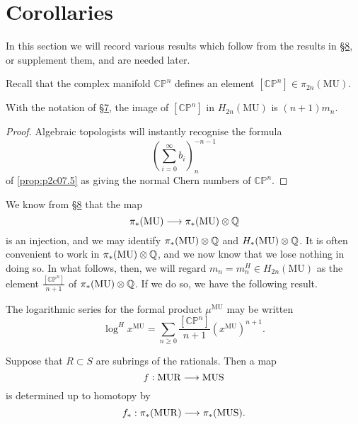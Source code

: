 \documentclass[../main]{subfiles}
\begin{document}
\label{sec:p2c9}
\chapter{Corollaries}
In this section we will record various results which follow from the results in \hyperref[sec:p2c8]{\S 8}, or supplement them, and are needed later.

Recall that the complex manifold $\mathbb {CP}^n$ defines an element $[\mathbb {CP}^n] \in \pi_{2n} (\mathrm {MU})$.

\begin{lemma}
\label{lem:p2c09.1}
With the notation of \hyperref[sec:p2c7]{\S 7}, the image of $[\mathbb {CP}^n]$ in $H_{2n}(\mathrm {MU})$ is $(n + 1)m_n$.
\end{lemma}

\begin{proof}
Algebraic topologists will instantly recognise the formula $$\left(\sum_{i = 0}^\infty b_i\right)_n^{-n - 1}$$ of \eqref{prop:p2c07.5} as giving the normal Chern numbers of $\mathbb {CP}^n$.
\end{proof}
We know from \hyperref[sec:p2c8]{\S 8} that the map $$\pi_\ast(\mathrm{MU}) \overset{}{\longrightarrow} \pi_\ast(\mathrm {MU}) \otimes \mathbb{Q}$$ is an injection, and we may identify $\pi_\ast(\mathrm{MU}) \otimes \mathbb{Q}$ and $H_\ast(\mathrm{MU}) \otimes \mathbb{Q}$. It is often convenient to work in $\pi_\ast(\mathrm{MU}) \otimes \mathbb{Q}$, and we now know that we lose nothing in doing so. In what follows, then, we will regard $m_n = m_n^H \in H_{2n}(\mathrm{MU})$ as the element $\tfrac {[\mathbb {CP}^n]} {n + 1}$ of $\pi_\ast(\mathrm {MU}) \otimes \mathbb{Q}$. If we do so, we have the following result. 

\begin{corollary}
\label{cor:p2c09.2}
The logarithmic series for the formal product $\mu^{\mathrm{MU}}$ may be written $$\log^{H} x^{\mathrm{MU}} = \sum_{n \ge 0} \frac {[\mathbb {CP}^n]} {n + 1} (x^{\mathrm {MU}})^{n + 1}.$$
\end{corollary}

\begin{lemma}
\label{lem:p2c09.3}
Suppose that $R \subset S$ are subrings of the rationals. Then a map $$f : \mathrm{MUR} \overset{}{\longrightarrow} \mathrm{MUS}$$ is determined up to homotopy by $$f_\ast : \pi_\ast(\mathrm{MUR}) \overset{}{\longrightarrow} \pi_\ast(\mathrm{MUS}).$$
\end{lemma}
\end{document}

